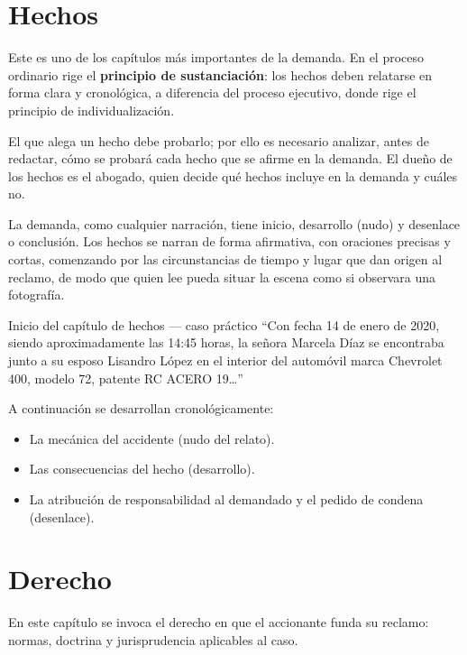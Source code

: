 \documentclass[12pt,oneside]{book}
\begin{document}
\section{Hechos}

Este es uno de los capítulos más importantes de la demanda. En el proceso ordinario rige el \textbf{principio de sustanciación}: los hechos deben relatarse en forma clara y cronológica, a diferencia del proceso ejecutivo, donde rige el principio de individualización.

\begin{important}
El que alega un hecho debe probarlo; por ello es necesario analizar, antes de redactar, cómo se probará cada hecho que se afirme en la demanda. El dueño de los hechos es el abogado, quien decide qué hechos incluye en la demanda y cuáles no.
\end{important}

La demanda, como cualquier narración, tiene inicio, desarrollo (nudo) y desenlace o conclusión. Los hechos se narran de forma afirmativa, con oraciones precisas y cortas, comenzando por las circunstancias de tiempo y lugar que dan origen al reclamo, de modo que quien lee pueda situar la escena como si observara una fotografía.

\begin{example}{Inicio del capítulo de hechos — caso práctico}
``Con fecha 14 de enero de 2020, siendo aproximadamente las 14:45 horas, la señora Marcela Díaz se encontraba junto a su esposo Lisandro López en el interior del automóvil marca Chevrolet 400, modelo 72, patente RC ACERO 19\ldots''

A continuación se desarrollan cronológicamente:
\begin{itemize}
    \item La mecánica del accidente (nudo del relato).
    \item Las consecuencias del hecho (desarrollo).
    \item La atribución de responsabilidad al demandado y el pedido de condena (desenlace).
\end{itemize}
\end{example}

\section{Derecho}

En este capítulo se invoca el derecho en que el accionante funda su reclamo: normas, doctrina y jurisprudencia aplicables al caso.
\end{document}
